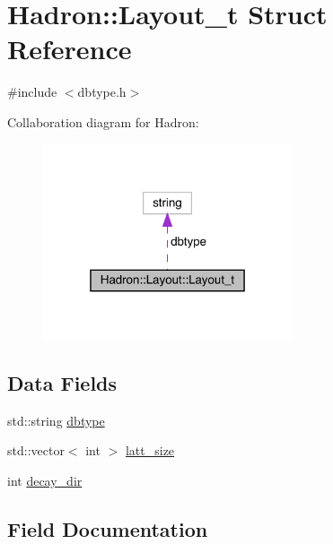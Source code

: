\hypertarget{structHadron_1_1Layout_1_1Layout__t}{}\section{Hadron\+:\+:Layout\+\_\+t Struct Reference}
\label{structHadron_1_1Layout_1_1Layout__t}


{\ttfamily \#include $<$dbtype.\+h$>$}



Collaboration diagram for Hadron\+:\nopagebreak
\begin{figure}[H]
\begin{center}
\leavevmode
\includegraphics[width=208pt]{d9/d1f/structHadron_1_1Layout_1_1Layout__t__coll__graph}
\end{center}
\end{figure}
\subsection*{Data Fields}
\begin{DoxyCompactItemize}
\item 
std\+::string \mbox{\hyperlink{structHadron_1_1Layout_1_1Layout__t_a71d86f89312b6a84c1c470119494022e}{dbtype}}
\item 
std\+::vector$<$ int $>$ \mbox{\hyperlink{structHadron_1_1Layout_1_1Layout__t_afa1541a7400b0f7d7967ff4d518e0a96}{latt\+\_\+size}}
\item 
int \mbox{\hyperlink{structHadron_1_1Layout_1_1Layout__t_aeb89b410154551d4dade862bf5a55955}{decay\+\_\+dir}}
\end{DoxyCompactItemize}


\subsection{Field Documentation}
\mbox{\label{structHadron_1_1Layout_1_1Layout__t_a71d86f89312b6a84c1c470119494022e}} 
